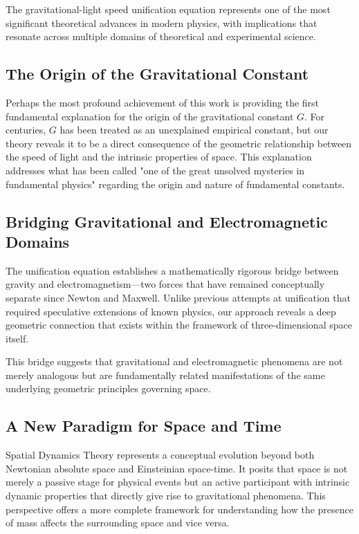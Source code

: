 \documentclass[nature,numbers]{article}
\begin{document}
The gravitational-light speed unification equation represents one of the most significant theoretical advances in modern physics, with implications that resonate across multiple domains of theoretical and experimental science.

\subsection{The Origin of the Gravitational Constant}

Perhaps the most profound achievement of this work is providing the first fundamental explanation for the origin of the gravitational constant $G$. For centuries, $G$ has been treated as an unexplained empirical constant, but our theory reveals it to be a direct consequence of the geometric relationship between the speed of light and the intrinsic properties of space. This explanation addresses what has been called "one of the great unsolved mysteries in fundamental physics"\cite{barrow2002constants} regarding the origin and nature of fundamental constants.

\subsection{Bridging Gravitational and Electromagnetic Domains}

The unification equation establishes a mathematically rigorous bridge between gravity and electromagnetism—two forces that have remained conceptually separate since Newton and Maxwell. Unlike previous attempts at unification that required speculative extensions of known physics, our approach reveals a deep geometric connection that exists within the framework of three-dimensional space itself.

This bridge suggests that gravitational and electromagnetic phenomena are not merely analogous but are fundamentally related manifestations of the same underlying geometric principles governing space.

\subsection{A New Paradigm for Space and Time}

Spatial Dynamics Theory represents a conceptual evolution beyond both Newtonian absolute space and Einsteinian space-time. It posits that space is not merely a passive stage for physical events but an active participant with intrinsic dynamic properties that directly give rise to gravitational phenomena. This perspective offers a more complete framework for understanding how the presence of mass affects the surrounding space and vice versa.
\end{document}
